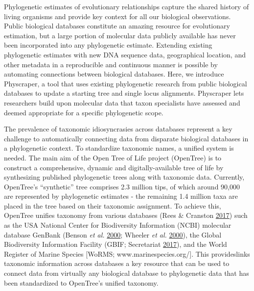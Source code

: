 \documentclass[]{article}
\begin{document}
Phylogenetic estimates of evolutionary relationships capture the shared history of living organisms and provide key context for all our biological observations.
Public biological databases constitute an amazing resource for evolutionary estimation, but a large portion of molecular data publicly available has never been incorporated into any phylogenetic estimate. Extending existing phylogenetic estimates with new DNA sequence data, geographical location, and other metadata in a reproducible and continuous manner is possible by automating connections between biological databases. Here, we introduce Physcraper, a tool that uses existing phylogenetic research from public biological databases to update a starting tree and single locus alignments. Physcraper lets researchers build upon molecular data that taxon specialists have assessed and deemed appropriate for a specific phylogenetic scope.

The prevalence of taxonomic idiosyncrasies across databases represent a key challenge to automatically connecting data from disparate biological databases in a phylogenetic context. To standardize taxonomic names, a unified system is needed. The main aim of the Open Tree of Life project (OpenTree)
is to construct a comprehensive, dynamic and digitally-available tree of life by synthesizing published phylogenetic trees along with taxonomic data. Currently, OpenTree's ``synthetic'' tree comprises 2.3 million tips, of which around 90,000 are represented by phylogenetic estimates - the remaining 1.4 million taxa are placed in the tree based on their taxonomic assignment. To achieve this, OpenTree unifies taxonomy from various databases (Rees \& Cranston \protect\hyperlink{ref-rees2017automated}{2017}) such as the USA National Center for Biodiversity Information (NCBI) molecular database GenBank (Benson \emph{et al.} \protect\hyperlink{ref-benson2000genbank}{2000}; Wheeler \emph{et al.} \protect\hyperlink{ref-wheeler2000database}{2000}), the Global Biodiversity Information Facility (GBIF; Secretariat \protect\hyperlink{ref-secretariat2017gbif}{2017}), and the World Register of Marine Species {[}WoRMS; www.marinespecies.org/{]}. This provideslinks taxonomic information across databases a key resource that can be used to connect data from virtually any biological database to phylogenetic data that has been standardized to OpenTree's unified taxonomy.
\end{document}
